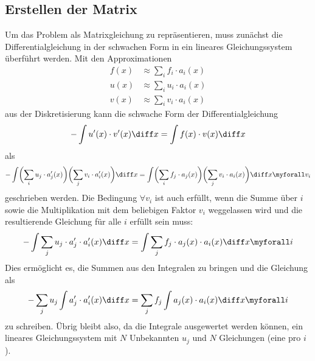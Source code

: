 \subsection{Erstellen der Matrix \label{fem:1d:matrix_erstellen}}
Um das Problem als Matrixgleichung zu repräsentieren, muss zunächst die Differentialgleichung in der schwachen Form in ein lineares Gleichungssystem überführt werden.
Mit den Approximationen 
\begin{align}
    f(x) &\approx \sum_i f_i \cdot a_i(x) \\
    u(x) &\approx \sum_i u_i \cdot a_i(x) \\
    v(x) &\approx \sum_i v_i \cdot a_i(x)
\end{align}
aus der Diskretisierung kann die schwache Form der Differentialgleichung 
\begin{equation}
    - \int u'(x) \cdot v'(x) \diff x = \int f(x) \cdot v(x) \diff x
\end{equation}
als
\begin{equation}
    - \int \biggl(\sum_i u_j \cdot a'_j(x)\biggr) \biggl(\sum_j v_i \cdot a'_i(x)\biggr) \diff x 
    = \int \biggl(\sum_i f_j \cdot a_j(x) \biggr) \biggl(\sum_j v_i \cdot a_i(x) \biggr) \diff x 
    \myforall v_i
\end{equation}
geschrieben werden.
Die Bedingung $\forall v_i$ ist auch erfüllt, wenn die Summe über $i$ sowie die Multiplikation mit dem beliebigen Faktor $v_i$ weggelassen wird und die resultierende Gleichung für alle $i$ erfüllt sein muss: %
\begin{equation}
    - \int \sum_j u_j \cdot a'_j \cdot a'_i(x) \diff x = \int \sum_j f_j \cdot a_j(x) \cdot a_i(x) \diff x \myforall i
\end{equation}
Dies ermöglicht es, die Summen aus den Integralen zu bringen und die Gleichung als
\begin{equation}
    - \sum_j u_j \int a'_j \cdot a'_i(x) \diff x = \sum_j f_j \int a_j(x) \cdot a_i(x) \diff x \myforall i \label{papers:fem:prinzip1d:finale_gleichung}
\end{equation}
zu schreiben.
Übrig bleibt also, da die Integrale ausgewertet werden können, ein lineares Gleichungssystem mit $N$ Unbekannten $u_j$ und $N$ Gleichungen (eine pro $i$). 

